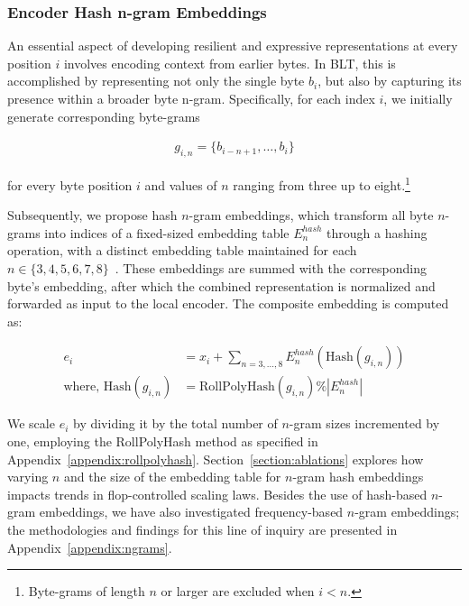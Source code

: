 \subsubsection{Encoder Hash n-gram Embeddings}
\label{sec:ngram-emb}
\label{sec:hash-emb}
An essential aspect of developing resilient and expressive representations at every position $i$ involves encoding context from earlier bytes. In {\textsc BLT}, this is accomplished by representing not only the single byte $b_i$, but also by capturing its presence within a broader byte n-gram. Specifically, for each index $i$, we initially generate corresponding byte-grams

\begin{align}
    g_{i,n}=\{b_{i-n + 1},\ldots, b_i\}
\end{align}

for every byte position $i$ and values of $n$ ranging from three up to eight.\footnote{
Byte-grams of length $n$ or larger are excluded when $i < n$. }

Subsequently, we propose hash $n$-gram embeddings, which transform all byte $n$-grams into indices of a fixed-sized embedding table $E_{n}^{hash}$ through a hashing operation, with a distinct embedding table maintained for each $n \in\{3,4,5,6,7,8\}$~\citep{bai2010learning}. 
These embeddings are summed with the corresponding byte’s embedding, after which the combined representation is normalized and forwarded as input to the local encoder. The composite embedding is computed as:

\begin{align}
e_i &= x_i + \sum_{n = 3,...,8}E_{n}^{hash}(\text{Hash}(g_{i,n})) \\
\text{where, Hash}(g_{i,n}) &= \text{RollPolyHash}(g_{i,n}) \% |E_{n}^{hash}|
\end{align}

We scale $e_i$ by dividing it by the total number of $n$-gram sizes incremented by one, employing the RollPolyHash method as specified in Appendix~\ref{appendix:rollpolyhash}. Section~\ref{section:ablations} explores how varying $n$ and the size of the embedding table for $n$-gram hash embeddings impacts trends in flop-controlled scaling laws. Besides the use of hash-based $n$-gram embeddings, we have also investigated frequency-based $n$-gram embeddings; the methodologies and findings for this line of inquiry are presented in Appendix~\ref{appendix:ngrams}.

